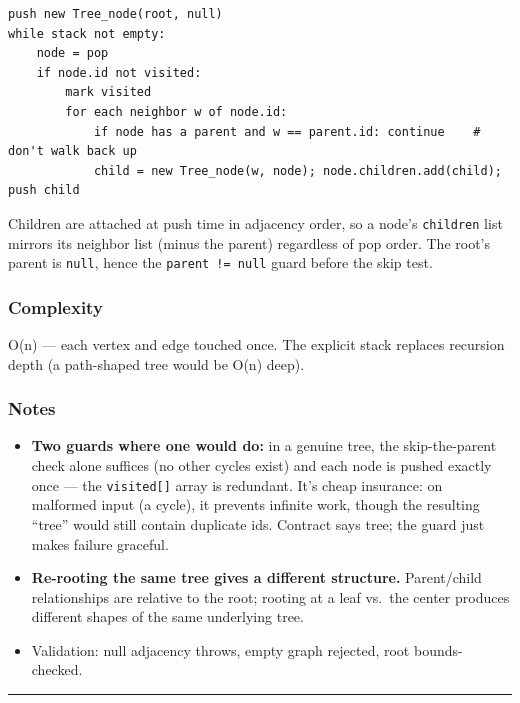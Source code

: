 \documentclass[
  10pt,
  letterpaper,
  onecolumn]{article}
\providecommand{\tightlist}{%
  \setlength{\itemsep}{0pt}\setlength{\parskip}{0pt}}
\begin{document}
\begin{verbatim}
push new Tree_node(root, null)
while stack not empty:
    node = pop
    if node.id not visited:
        mark visited
        for each neighbor w of node.id:
            if node has a parent and w == parent.id: continue    # don't walk back up
            child = new Tree_node(w, node); node.children.add(child); push child
\end{verbatim}

Children are attached at push time in adjacency order, so a node's
\texttt{children} list mirrors its neighbor list (minus the parent)
regardless of pop order. The root's parent is \texttt{null}, hence the
\texttt{parent\ !=\ null} guard before the skip test.

\hypertarget{complexity-9}{%
\subsubsection{Complexity}\label{complexity-9}}

O(n) --- each vertex and edge touched once. The explicit stack replaces
recursion depth (a path-shaped tree would be O(n) deep).

\hypertarget{notes-8}{%
\subsubsection{Notes}\label{notes-8}}

\begin{itemize}
\tightlist
\item
  \textbf{Two guards where one would do:} in a genuine tree, the
  skip-the-parent check alone suffices (no other cycles exist) and each
  node is pushed exactly once --- the \texttt{visited{[}{]}} array is
  redundant. It's cheap insurance: on malformed input (a cycle), it
  prevents infinite work, though the resulting ``tree'' would still
  contain duplicate ids. Contract says tree; the guard just makes
  failure graceful.
\item
  \textbf{Re-rooting the same tree gives a different structure.}
  Parent/child relationships are relative to the root; rooting at a leaf
  vs.~the center produces different shapes of the same underlying tree.
\item
  Validation: null adjacency throws, empty graph rejected, root
  bounds-checked.
\end{itemize}

\begin{center}\rule{0.5\linewidth}{0.5pt}\end{center}
\end{document}

